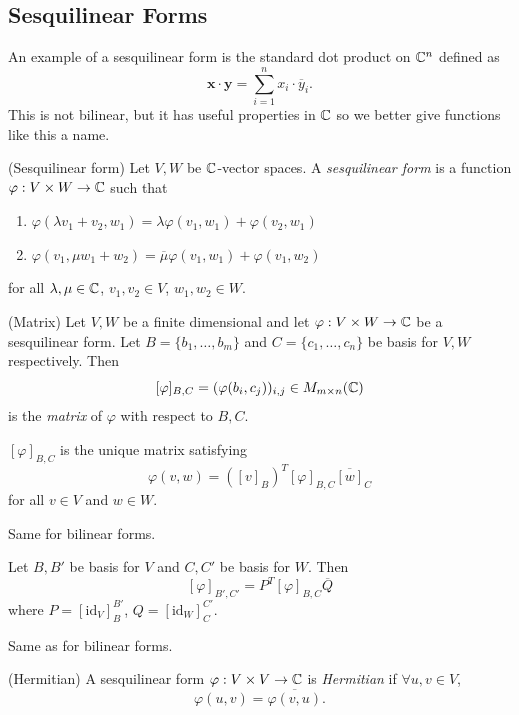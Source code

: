 \documentclass{article}
\renewcommand{\id}{\mathrm{id}}
\begin{document}
\subsection{Sesquilinear Forms}
An example of a sesquilinear form is the standard dot product on $ \mathbb{C}^n $ defined as
\[
	\mathbf x\cdot \mathbf y = \sum_{i=1}^nx_i\cdot \overline y_i.
\]
This is not bilinear, but it has useful properties in $ \mathbb{C} $ so we better give functions like this a name.
\begin{definition}
	(Sesquilinear form) Let $ V,W $ be $ \mathbb{C} $-vector spaces. A \textit{sesquilinear form} is a function $ \varphi:V\times W\to \mathbb{C} $ such that
	\begin{enumerate}
		\item $ \varphi(\lambda v_1+v_2,w_1)=\lambda\varphi(v_1,w_1)+\varphi(v_2,w_1) $
		\item $ \varphi(v_1,\mu w_1+w_2)=\overline \mu \varphi(v_1,w_1)+\varphi(v_1,w_2) $
	\end{enumerate}
	for all $ \lambda,\mu \in \mathbb{C} $, $ v_1,v_2\in V $, $ w_1,w_2\in W $.
\end{definition}
\begin{definition}
	(Matrix) Let $ V,W $ be a finite dimensional and let $ \varphi:V\times W\to \mathbb{C} $ be a sesquilinear form. Let $ B=\{b_1,\dots, b_m\} $ and $ C=\{c_1,\dots, c_n\} $ be basis for $ V,W $ respectively. Then
	\[
		[\varphi]_{B,C}=(\varphi(b_i,c_j))_{i,j}\in M_{m\times n}(\mathbb{C})
	\]
	is the \textit{matrix} of $ \varphi $ with respect to $ B,C $.
\end{definition}
\begin{proposition}
	$ [\varphi]_{B,C} $ is the unique matrix satisfying
	\[
	\varphi(v,w)=	([v]_B)^T[\varphi]_{B,C}\overline{[w]}_C
	\]
	for all $ v\in V $ and $ w\in W $.
\end{proposition}
\pf Same for bilinear forms.
\begin{corollary}
  Let $ B,B' $ be basis for $ V $ and $ C,C' $ be basis for $ W $. Then
  \[
	  [\varphi]_{B',C'}=P^T[\varphi]_{B,C}\overline Q
  \]
  where $ P=[\id_V]^{B'}_B $, $ Q=[\id_W]^{C'}_C $.
\end{corollary}
\pf Same as for bilinear forms.
\begin{definition}
	(Hermitian) A sesquilinear form $ \varphi:V\times V\to \mathbb{C} $ is \textit{Hermitian} if $ \forall u,v\in V $,
	\[
		\varphi(u,v)=\overline{\varphi(v,u)}.
	\]
\end{definition}
\end{document}

